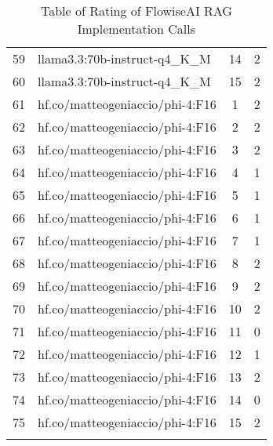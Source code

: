 \begin{longtable}{|c|p{7cm}|c|c|}
59 & llama3.3:70b-instruct-q4\_K\_M & 14 & 2 \\
60 & llama3.3:70b-instruct-q4\_K\_M & 15 & 2 \\
61 & hf.co/matteogeniaccio/phi-4:F16 & 1 & 2 \\
62 & hf.co/matteogeniaccio/phi-4:F16 & 2 & 2 \\
63 & hf.co/matteogeniaccio/phi-4:F16 & 3 & 2 \\
64 & hf.co/matteogeniaccio/phi-4:F16 & 4 & 1 \\
65 & hf.co/matteogeniaccio/phi-4:F16 & 5 & 1 \\
66 & hf.co/matteogeniaccio/phi-4:F16 & 6 & 1 \\
67 & hf.co/matteogeniaccio/phi-4:F16 & 7 & 1 \\
68 & hf.co/matteogeniaccio/phi-4:F16 & 8 & 2 \\
69 & hf.co/matteogeniaccio/phi-4:F16 & 9 & 2 \\
70 & hf.co/matteogeniaccio/phi-4:F16 & 10 & 2 \\
71 & hf.co/matteogeniaccio/phi-4:F16 & 11 & 0 \\
72 & hf.co/matteogeniaccio/phi-4:F16 & 12 & 1 \\
73 & hf.co/matteogeniaccio/phi-4:F16 & 13 & 2 \\
74 & hf.co/matteogeniaccio/phi-4:F16 & 14 & 0 \\
75 & hf.co/matteogeniaccio/phi-4:F16 & 15 & 2 \\
\bottomrule
\caption[]{Table of Rating of FlowiseAI RAG Implementation Calls}
\end{longtable}
